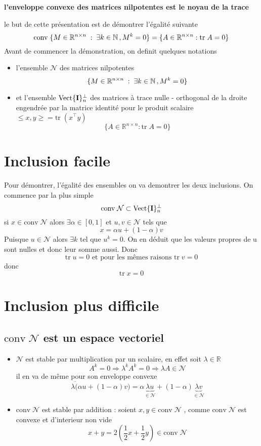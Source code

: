 \documentclass[10pt]{article}
\newcommand{\R}{\mathbb{R}}
\newcommand{\N}{\mathbb{N}}
\newcommand{\conv}{\mathrm{conv} \;}
\newcommand{\tr}{\mathrm{tr} \;}
\newcommand{\matr}[2]{\R^{#1 \times #2}}
\newcommand{\nilp}{\mathcal{N}}
\newcommand{\trnul}{\mathrm{Vect}\{{\bf I}\}_n^{\bot}}
\newcommand{\tran}{^{\top}}
\begin{document}
{\bf \Large l'enveloppe convexe des matrices nilpotentes est le noyau de la trace}

le but de cette présentation est de démontrer l'égalité suivante
$$
\conv \{ M \in \matr{n}{n} \;:\; \exists k \in \N \, , \, \\ M^k = 0\} = \{A \in \matr{n}{n} : \tr A = 0  \}
$$
Avant de commencer la démonstration, on definit quelques notations

\begin{itemize} 
        \item l'ensemble $\nilp$ des matrices nilpotentes
$$
            \{ M \in \matr{n}{n} \;:\; \exists k \in \N \, , \, \\ M^k = 0\}
$$
   \item et l'ensemble $\trnul$ des matrices à trace nulle - orthogonal de la droite engendrée par la matrice identité pour le produit scalaire 
       $\leqslant x, y \geqslant = \tr (x\tran y)$
$$
\{A \in \matr{n}{n} : \tr A = 0  \}
$$
\end{itemize}

\section{Inclusion facile}

Pour démontrer, l'égalité des ensembles on va demontrer les deux inclusions. On commence par la plus simple
$$
\conv \nilp \subset \trnul
$$
si $x \in \conv \nilp $ alors $\exists \alpha \in [0,1]$ et $u,v \in \nilp$ tels que
$$
x = \alpha u + (1-\alpha) v
$$
Puisque $u \in \nilp$ alors $\exists k$ tel que $u^k = 0$. On en déduit que les valeurs propres de u sont nulles et donc leur somme aussi.
Donc
$$
\tr u = 0  \mbox { et pour les mêmes raisons } \tr v = 0
$$
donc
$$
\tr x = 0
$$
\section{Inclusion plus difficile}

\subsection{$\conv \nilp$ est un espace vectoriel}
\begin{itemize}
    \item $\nilp$ est stable par multiplication par un scalaire, en effet soit $\lambda \in \R$
$$
A^k = 0 \Rightarrow \lambda^k A^k = 0 \Rightarrow \lambda A \in \nilp
$$
  il en va de même pour son enveloppe convexe
$$
\lambda \dot ( \alpha u + (1-\alpha) v ) = \alpha \underbrace{\lambda u}_{\in \nilp}  + (1- \alpha) \underbrace{\lambda v}_{\in \nilp}
$$
   \item $\conv \nilp $ est stable par addition :  soient $x,y \in \conv \nilp$ , comme $ \conv \nilp$ est convexe et d'interieur non vide
$$
        x + y = 2 \left(\frac{1}{2} x + \frac{1}{2} y \right)  \in \conv \nilp
$$
\end{itemize}
\end{document}
